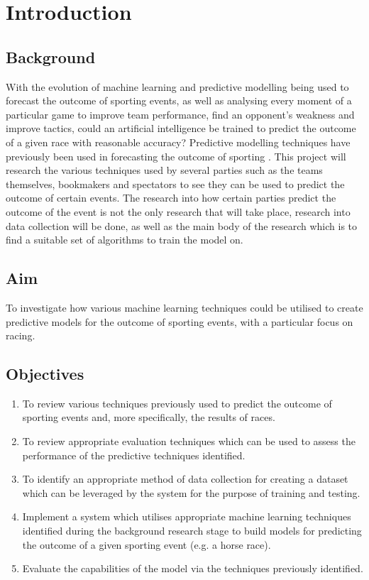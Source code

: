 \chapter{Introduction}
 \setcounter{page}{1}

\section{Background}

With the evolution of machine learning and predictive modelling being used to forecast the outcome of sporting events, as well as analysing every moment of a particular game to improve team performance, find an opponent's weakness and improve tactics, could an artificial intelligence be trained to predict the outcome of a given race with reasonable accuracy? Predictive modelling techniques have previously been used in forecasting the outcome of sporting \cite{2015arXiv151105837K,trap2493,5647440}.
This project will research the various techniques used by several parties such as the teams themselves, bookmakers and spectators to see they can be used to predict the outcome of certain events. The research into how certain parties predict the outcome of the event is not the only research that will take place, research into data collection will be done, as well as the main body of the research which is to find a suitable set of algorithms to train the model on.

\section{Aim}
To investigate how various machine learning techniques could be utilised to create predictive models for the outcome of sporting events, with a particular focus on racing.


\section{Objectives}

\begin{enumerate}
    \item To review various techniques previously used to predict the outcome of sporting events and, more specifically, the results of races.
    \item To review appropriate evaluation techniques which can be used to assess the performance of the predictive techniques identified.
    \item To identify an appropriate method of data collection for creating a dataset which can be leveraged by the system for the purpose of training and testing.
    \item Implement a system which utilises appropriate machine learning techniques identified during the background research stage to build models for predicting the outcome of a given sporting event (e.g. a horse race).
    \item Evaluate the capabilities of the model via the techniques previously identified.
\end{enumerate}

